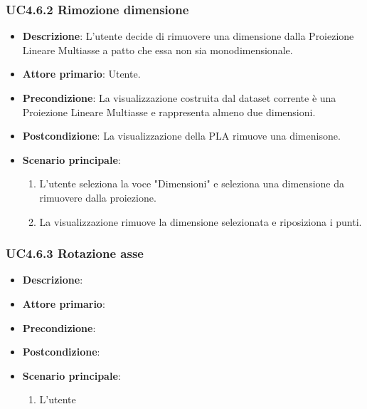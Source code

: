 \subsubsection{UC4.6.2 Rimozione dimensione}
\label{ssub:uc4.6.2}
\begin{itemize}
    \item \textbf{Descrizione}: L’utente decide di rimuovere una dimensione dalla Proiezione Lineare Multiasse
                                a patto che essa non sia monodimensionale.

    \item \textbf{Attore primario}: Utente.
    
    \item \textbf{Precondizione}:   La visualizzazione costruita dal dataset corrente è una Proiezione Lineare Multiasse
                                    e rappresenta almeno due dimensioni.
    \item \textbf{Postcondizione}:  La visualizzazione della PLA rimuove una dimenisone.

	\item \textbf{Scenario principale}:
        \begin{enumerate}
            \item L'utente seleziona la voce "Dimensioni" e seleziona una dimensione da rimuovere dalla proiezione.
            \item La visualizzazione rimuove la dimensione selezionata e riposiziona i punti.
           
        \end{enumerate}
\end{itemize}

\subsubsection{UC4.6.3 Rotazione asse}
\label{ssub:uc4.6.3}
\begin{itemize}
    \item \textbf{Descrizione}:
    \item \textbf{Attore primario}:
    \item \textbf{Precondizione}:
    \item \textbf{Postcondizione}:
    \item \textbf{Scenario principale}:
    \begin{enumerate}
        \item L'utente
    \end{enumerate}
\end{itemize}

